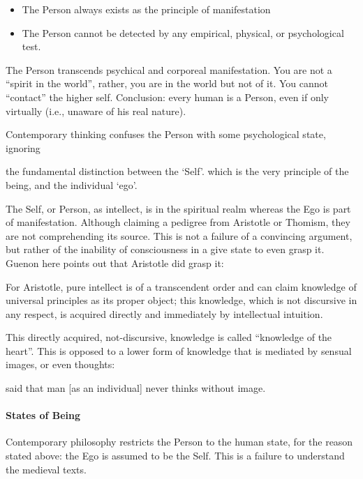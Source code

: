 \begin{itemize}
\item The Person always exists as the principle of manifestation 
\item The Person cannot be detected by any empirical, physical, or psychological test. 
\end{itemize}
The Person transcends psychical and corporeal manifestation. You are not a “spirit in the world”, rather, you are in the world but not of it. You cannot “contact” the higher self. Conclusion: every human is a Person, even if only virtually (i.e., unaware of his real nature).

Contemporary thinking confuses the Person with some psychological state, ignoring

\begin{quotex}
the fundamental distinction between the `Self'. which is the very principle of the being, and the individual `ego'.

\end{quotex}
The Self, or Person, as intellect, is in the spiritual realm whereas the Ego is part of manifestation. Although claiming a pedigree from Aristotle or Thomism, they are not comprehending its source. This is not a failure of a convincing argument, but rather of the inability of consciousness in a give state to even grasp it. Guenon here points out that Aristotle did grasp it:

\begin{quotex}
For Aristotle, pure intellect is of a transcendent order and can claim knowledge of universal principles as its proper object; this knowledge, which is not discursive in any respect, is acquired directly and immediately by intellectual intuition.

\end{quotex}
This directly acquired, not-discursive, knowledge is called “knowledge of the heart”. This is opposed to a lower form of knowledge that is mediated by sensual images, or even thoughts:

\begin{quotex}
[Aristotle] said that man [as an individual] never thinks without image.

\end{quotex}
\paragraph{States of Being}
Contemporary philosophy restricts the Person to the human state, for the reason stated above: the Ego is assumed to be the Self. This is a failure to understand the medieval texts.

